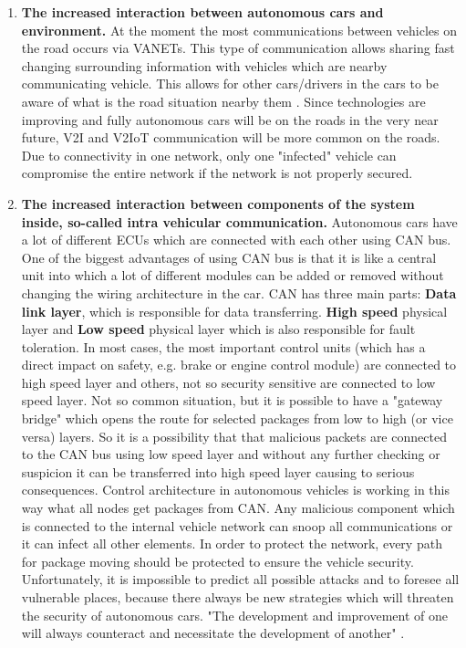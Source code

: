 \begin{enumerate}
	\item \textbf{The increased interaction between autonomous cars and environment.} At the moment the most communications between vehicles on the road occurs via \glspl{VANET}. This type of communication allows sharing fast changing surrounding information with vehicles which are nearby communicating vehicle. This allows for other cars/drivers in the cars to be aware of what is the road situation nearby them \cite{carspeak}. Since technologies are improving and fully autonomous cars will be on the roads in the very near future, \gls{V2I} and \gls{V2IoT} communication will be more common on the roads. Due to connectivity in one network, only one "infected" vehicle can compromise the entire network if the network is not properly secured.
	\item \textbf{The increased interaction between components of the system inside, so-called intra vehicular communication.} Autonomous cars have a lot of different \glspl{ECU} which are connected with each other using \gls{CAN} bus. One of the biggest advantages of using \gls{CAN} bus is that it is like a central unit into which a lot of different modules can be added or removed without changing the wiring architecture in the car. \gls{CAN} has three main parts:  \textbf{Data link layer}, which is responsible for data transferring. \textbf{High speed} physical layer and \textbf{Low speed} physical layer which is also responsible for fault toleration. In most cases, the most important control units (which has a direct impact on safety, e.g. brake or engine control module) are connected to high speed layer and others, not so security sensitive are connected to low speed layer. Not so common situation, but it is possible to have a "gateway bridge" which opens the route for selected packages from low to high (or vice versa) layers. So it is a possibility that that malicious packets are connected to the \gls{CAN} bus using low speed layer and without any further checking or suspicion it can be transferred into high speed layer causing to serious consequences. Control architecture in autonomous vehicles is working in this way what all nodes get packages from \gls{CAN}. Any malicious component which is connected to the internal vehicle network can snoop all communications or it can infect all other elements. In order to protect the network, every path for package moving should be protected to ensure the vehicle security. Unfortunately, it is impossible to predict all possible attacks and to foresee all vulnerable places, because there always be new strategies which will threaten the security of autonomous cars. "The development and improvement of one will always counteract and necessitate the development of another" \cite{sec}. \\	

\end{enumerate}
